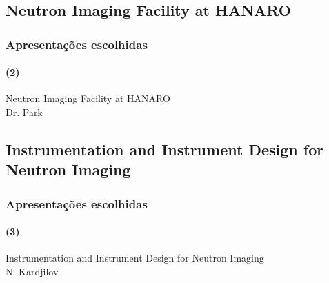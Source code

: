 \documentclass[svgnames,smaller,table]{beamer}
\begin{document}
\subsection{Neutron Imaging Facility at HANARO}
\begin{frame}
  \frametitle{Apresentações escolhidas}
  \framesubtitle{(2)}
  \begin{center}
    Neutron Imaging Facility at HANARO\\
    \vspace{2.0cm}
    Dr. Park
  \end{center}
\end{frame}


\begin{frame}
  
\end{frame}

\begin{frame}
  
\end{frame}

\begin{frame}
    
\end{frame}

\begin{frame}
  
\end{frame}

\begin{frame}
  
\end{frame}

\begin{frame}
  
\end{frame}

\begin{frame}
  
\end{frame}

\begin{frame}
  
\end{frame}

\begin{frame}
  
\end{frame}

\subsection{Instrumentation and Instrument Design for Neutron Imaging}
\begin{frame}
  \frametitle{Apresentações escolhidas}
  \framesubtitle{(3)}
  \begin{center}
    Instrumentation and Instrument Design for Neutron Imaging\\
    \vspace{2.0cm}
    N. Kardjilov
  \end{center}
\end{frame}
\end{document}
